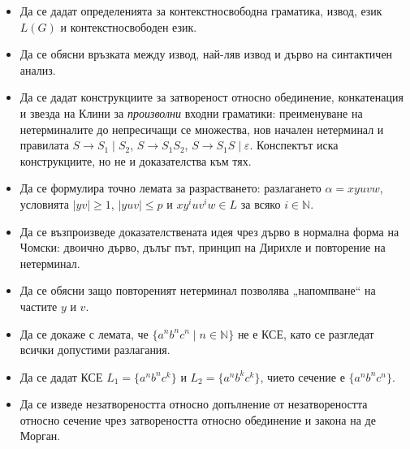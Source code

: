 \begin{itemize}
\item Да се дадат определенията за контекстносвободна граматика, извод, език $L(G)$ и контекстносвободен език.
\item Да се обясни връзката между извод, най-ляв извод и дърво на синтактичен анализ.
\item Да се дадат конструкциите за затвореност относно обединение, конкатенация и звезда на Клини за \emph{произволни} входни граматики: преименуване на нетерминалите до непресичащи се множества, нов начален нетерминал и правилата $S\to S_1\mid S_2$, $S\to S_1S_2$, $S\to S_1S\mid\varepsilon$. Конспектът иска конструкциите, но не и доказателства към тях.
\item Да се формулира точно лемата за разрастването: разлагането $\alpha=xyuvw$, условията $|yv|\geq 1$, $|yuv|\leq p$ и $xy^iuv^iw\in L$ за всяко $i\in\mathbb{N}$.
\item Да се възпроизведе доказателствената идея чрез дърво в нормална форма на Чомски: двоично дърво, дълъг път, принцип на Дирихле и повторение на нетерминал.
\item Да се обясни защо повтореният нетерминал позволява „напомпване“ на частите $y$ и $v$.
\item Да се докаже с лемата, че $\{a^n b^n c^n\mid n\in\mathbb{N}\}$ не е КСЕ, като се разгледат всички допустими разлагания.
\item Да се дадат КСЕ $L_1=\{a^n b^n c^k\}$ и $L_2=\{a^n b^k c^k\}$, чието сечение е $\{a^n b^n c^n\}$.
\item Да се изведе незатвореността относно допълнение от незатвореността относно сечение чрез затвореността относно обединение и закона на де Морган.
\end{itemize}
